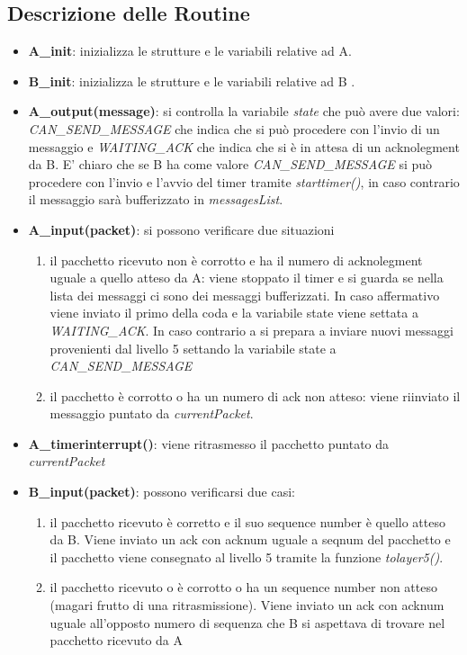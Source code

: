 \documentclass[a4paper]{article}
\begin{document}
\subsection{Descrizione delle Routine}
\begin{itemize}

\item \textbf{A\_init}: inizializza le strutture e le variabili relative ad A.

\item \textbf{B\_init}: inizializza le strutture e le variabili relative ad B
.
\item \textbf{A\_output(message)}: si controlla la variabile \emph{state} che può avere due valori: \emph{CAN\_SEND\_MESSAGE} che indica che si può procedere con l'invio di un messaggio e \emph{WAITING\_ACK} che indica che si è in attesa di un acknolegment da B. E' chiaro che se B ha come valore \emph{CAN\_SEND\_MESSAGE} si può procedere con l'invio e l'avvio del timer tramite \emph{starttimer()}, in caso contrario il messaggio sarà bufferizzato in \emph{messagesList}. 

\item \textbf{A\_input(packet)}: si possono verificare due situazioni
\begin{enumerate}
\item il pacchetto ricevuto non è corrotto e ha il numero di acknolegment uguale a quello atteso da A: viene stoppato il timer e si guarda se nella lista dei messaggi ci sono dei messaggi bufferizzati. In caso affermativo viene inviato il primo della coda e la variabile state viene settata a \emph{WAITING\_ACK}. In caso contrario a si prepara a inviare nuovi messaggi provenienti dal livello 5 settando la variabile state a \emph{CAN\_SEND\_MESSAGE}

\item il pacchetto è corrotto o ha un numero di ack non atteso: viene riinviato il messaggio puntato da \emph{currentPacket}.

\end{enumerate} 

\item \textbf{A\_timerinterrupt()}: viene ritrasmesso il pacchetto puntato da \emph{currentPacket}

\item \textbf{B\_input(packet)}: possono verificarsi due casi:
\begin{enumerate}
\item il pacchetto ricevuto è corretto e il suo sequence number è quello atteso da B. Viene inviato un ack con acknum uguale a seqnum del pacchetto e il pacchetto viene consegnato al livello 5 tramite la funzione \emph{tolayer5()}. 
\item il pacchetto ricevuto o è corrotto o ha un sequence number non atteso (magari frutto di una ritrasmissione). Viene inviato un ack con acknum uguale all'opposto numero di sequenza che B si aspettava di trovare nel pacchetto ricevuto da A
\end{enumerate}

\end{itemize}
\end{document}
